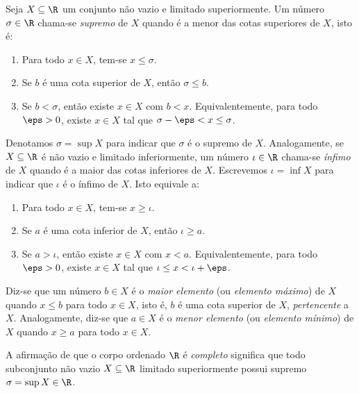 \documentclass{article}
\begin{document}
\begin{defn} [supremo]
    Seja \(X \subseteq \R\) um conjunto não vazio e limitado superiormente. Um número \(\sigma \in \R\) chama-se \emph{supremo} de \(X\) quando é a menor das cotas superiores de \(X\), isto é:
    \begin{enumerate}
        \item [\textbf{S1}] Para todo \(x \in X\), tem-se \(x \leq \sigma\).
        \item [\textbf{S2}] Se \(b\) é uma cota superior de \(X\), então \(\sigma \leq b\).
        \item [\textbf{S2'}] Se \(b < \sigma\), então existe \(x \in X\) com \(b < x\). Equivalentemente, para todo \(\eps > 0\), existe \(x \in X\) tal que \(\sigma - \eps < x \leq \sigma\).
    \end{enumerate}

    Denotamos \(\sigma = \sup X\) para indicar que \(\sigma\) é o supremo de \(X\).
    Analogamente, se \(X \subseteq \R\) é não vazio e limitado inferiormente, um número \(\iota \in \R\) chama-se \emph{ínfimo} de \(X\) quando é a maior das cotas inferiores de \(X\). Escrevemos \(\iota = \inf X\) para indicar que \(\iota\) é o ínfimo de \(X\). Isto equivale a:
    \begin{enumerate}
        \item [\textbf{I1}] Para todo \(x \in X\), tem-se \(x \geq \iota\).
        \item [\textbf{I2}] Se \(a\) é uma cota inferior de \(X\), então \(\iota \geq a\).
        \item [\textbf{I2'}] Se \(a > \iota\), então existe \(x \in X\) com \(x < a\). Equivalentemente, para todo \(\eps > 0\), existe \(x \in X\) tal que \(\iota \leq x < \iota + \eps\).
    \end{enumerate}
\end{defn}

\begin{defn}
    Diz-se que um número \(b \in X\) é o \emph{maior elemento} (ou \emph{elemento máximo}) de \(X\) quando \(x \leq b\) para todo \(x \in X\), isto é, \(b\) é uma cota superior de \(X\), \emph{pertencente} a \(X\). Analogamente, diz-se que \(a \in X\) é o \emph{menor elemento} (ou \emph{elemento mínimo}) de \(X\) quando \(x \geq a\) para todo \(x \in X\).
\end{defn}

A afirmação de que o corpo ordenado \(\R\) é \emph{completo} significa que todo subconjunto não vazio \(X \subseteq \R\) limitado superiormente possui supremo \(\sigma = \sup X \in \R\).
\end{document}
